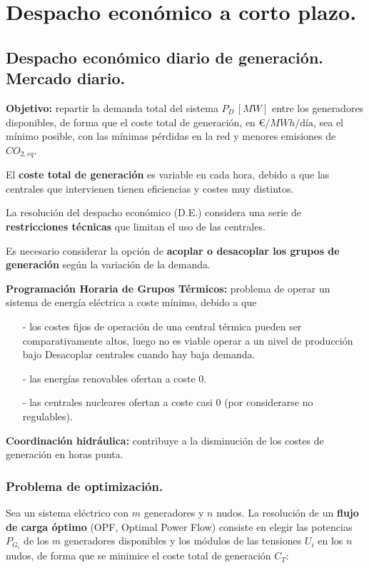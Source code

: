\chapter{Despacho económico a corto plazo.}
	\section{Despacho económico diario de generación. Mercado diario.}
		\textbf{Objetivo:} repartir la demanda total del sistema $P_D\,[MW]$ entre los generadores disponibles, de forma que el coste total de generación, en $\euro/MWh/\text{día}$, sea el mínimo posible, con las mínimas pérdidas en la red y menores emisiones de $CO_{2,eq}$.
		
		
		El \textbf{coste total de generación} es variable en cada hora, debido a que las centrales que intervienen tienen eficiencias y costes muy distintos.
		
		
		La resolución del despacho económico (D.E.) considera una serie de \textbf{restricciones técnicas} que limitan el uso de las centrales.
		
		
		Es necesario considerar la opción de \textbf{acoplar o desacoplar los grupos de generación} según la variación de la demanda.
		
		
		\textbf{Programación Horaria de Grupos Térmicos:} problema de operar un sistema de energía eléctrica a coste mínimo, debido a que
		
		\begin{itemize}
			\item[-] los costes fijos de operación de una central térmica pueden ser comparativamente altos, luego no es viable operar a un nivel de producción bajo \textrightarrow Desacoplar centrales cuando hay baja demanda.
			\item[-] las energías renovables ofertan a coste 0.
			\item[-] las centrales nucleares ofertan a coste casi 0 (por considerarse no regulables).
		\end{itemize}
		
		
		\textbf{Coordinación hidráulica:} contribuye a la disminución de los costes de generación en horas punta.
	
		\subsection{Problema de optimización.}
			Sea un sistema eléctrico con $m$ generadores y $n$ nudos. La resolución de un \textbf{flujo de carga óptimo} (OPF, Optimal Power Flow) consiste en elegir las potencias $P_{G_i}$ de los $m$ generadores disponibles y los módulos de las tensiones $U_i$ en los $n$ nudos, de forma que se minimice el coste total de generación $C_T$:
			
